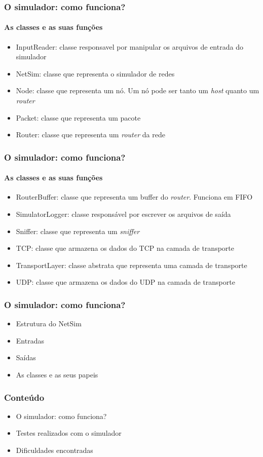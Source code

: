 \documentclass{beamer}
\begin{document}
\begin{frame}
	\frametitle{O simulador: como funciona?}
	\framesubtitle{As classes e as suas funções}
	\begin{itemize}
		\item InputReader: classe responsavel por manipular os arquivos de entrada do simulador
		\item NetSim: classe que representa o simulador de redes
		\item Node: classe que representa um nó. Um nó pode ser tanto um \textit{host} quanto um \textit{router}
		\item Packet: classe que representa um pacote
		\item Router: classe que representa um \textit{router} da rede 
	\end{itemize}
\end{frame}

\begin{frame}
	\frametitle{O simulador: como funciona?}
	\framesubtitle{As classes e as suas funções}
	\begin{itemize}
		\item RouterBuffer: classe que representa um buffer do \textit{router}. Funciona em FIFO
		\item SimulatorLogger: classe responsável por escrever os arquivos de saída
		\item Sniffer: classe que representa um \textit{sniffer}
		\item TCP: classe que armazena os dados do TCP na camada de transporte
		\item TransportLayer: classe abstrata que representa uma camada de transporte
		\item UDP: classe que armazena os dados do UDP na camada de transporte
	\end{itemize}
\end{frame}

\begin{frame}
	\frametitle{O simulador: como funciona?}
	\begin{itemize}
		\item \textcolor{covered}{Estrutura do NetSim}
		\item \textcolor{covered}{Entradas}
		\item \textcolor{covered}{Saídas}
		\item \textcolor{covered}{As classes e as seus papeis}
	\end{itemize}
\end{frame}

\begin{frame}
	\frametitle{Conteúdo}
	\begin{itemize}
		\item \textcolor{covered}{O simulador: como funciona?}
		\item Testes realizados com o simulador
		\item Dificuldades encontradas
	\end{itemize}
\end{frame}
\end{document}
